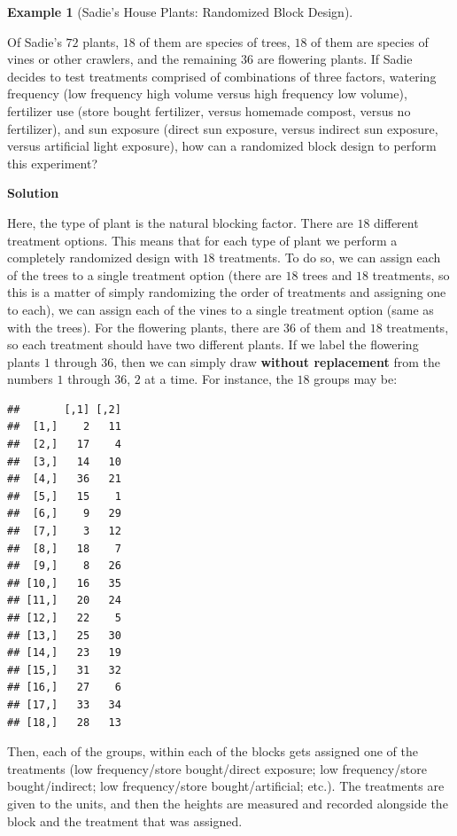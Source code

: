 \documentclass[
  letterpaper,
  DIV=11,
  numbers=noendperiod]{scrreprt}
\theoremstyle{definition}
\theoremstyle{definition}
\newtheorem{example}{Example}[chapter]
\theoremstyle{definition}
\theoremstyle{remark}
\begin{document}
\begin{example}[Sadie's House Plants: Randomized Block
Design]\protect\hypertarget{exm-randomized-block}{}\label{exm-randomized-block}

Of Sadie's \(72\) plants, \(18\) of them are species of trees, \(18\) of
them are species of vines or other crawlers, and the remaining \(36\)
are flowering plants. If Sadie decides to test treatments comprised of
combinations of three factors, watering frequency (low frequency high
volume versus high frequency low volume), fertilizer use (store bought
fertilizer, versus homemade compost, versus no fertilizer), and sun
exposure (direct sun exposure, versus indirect sun exposure, versus
artificial light exposure), how can a randomized block design to perform
this experiment?

\begin{tcolorbox}[enhanced jigsaw, colback=white, colframe=quarto-callout-color-frame, arc=.35mm, leftrule=.75mm, rightrule=.15mm, opacityback=0, breakable, bottomrule=.15mm, left=2mm, toprule=.15mm]

\vspace{-3mm}\textbf{Solution}\vspace{3mm}

Here, the type of plant is the natural blocking factor. There are \(18\)
different treatment options. This means that for each type of plant we
perform a completely randomized design with \(18\) treatments. To do so,
we can assign each of the trees to a single treatment option (there are
\(18\) trees and \(18\) treatments, so this is a matter of simply
randomizing the order of treatments and assigning one to each), we can
assign each of the vines to a single treatment option (same as with the
trees). For the flowering plants, there are \(36\) of them and \(18\)
treatments, so each treatment should have two different plants. If we
label the flowering plants \(1\) through \(36\), then we can simply draw
\textbf{without replacement} from the numbers \(1\) through \(36\),
\(2\) at a time. For instance, the \(18\) groups may be:

\begin{verbatim}
##       [,1] [,2]
##  [1,]    2   11
##  [2,]   17    4
##  [3,]   14   10
##  [4,]   36   21
##  [5,]   15    1
##  [6,]    9   29
##  [7,]    3   12
##  [8,]   18    7
##  [9,]    8   26
## [10,]   16   35
## [11,]   20   24
## [12,]   22    5
## [13,]   25   30
## [14,]   23   19
## [15,]   31   32
## [16,]   27    6
## [17,]   33   34
## [18,]   28   13
\end{verbatim}

Then, each of the groups, within each of the blocks gets assigned one of
the treatments (low frequency/store bought/direct exposure; low
frequency/store bought/indirect; low frequency/store bought/artificial;
etc.). The treatments are given to the units, and then the heights are
measured and recorded alongside the block and the treatment that was
assigned.

\end{tcolorbox}

\end{example}
\end{document}
